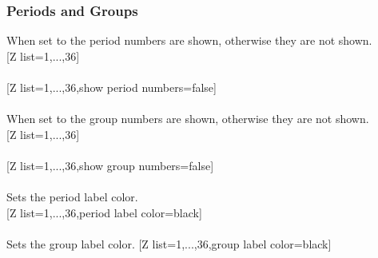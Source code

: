 \subsubsection{\texorpdfstring{ Periods and Groups}{Periods and Groups}}
\label{option_show period numbers}%
%
{When set to  the period numbers are shown, otherwise they are not shown.}%
\\ [5pt][Z list={1,...,36}]%
\\ [5pt]\makebox[\linewidth][c]{\scalebox{.6}{\pgfPT[Z list={1,...,36}]}}%
\\ [10pt][Z list={1,...,36},show period numbers=false]%
\\ [5pt]\makebox[\linewidth][c]{\scalebox{.6}{\pgfPT[Z list={1,...,36},show period numbers=false]}}%
\\ [5pt]\pgfPTendoption%
\label{option_show group numbers}%
%
{When set to  the group numbers are shown, otherwise they are not shown.}%
\\ [5pt][Z list={1,...,36}]%
\\ [10pt]\makebox[\linewidth][c]{\scalebox{.6}{\pgfPT[Z list={1,...,36}]}}%
\\ [10pt][Z list={1,...,36},show group numbers=false]%
\\ [10pt]\makebox[\linewidth][c]{\scalebox{.6}{\pgfPT[Z list={1,...,36},show group numbers=false]}}%
\\ [5pt]\pgfPTendoption%
\vfill%
\label{option_period label color}%
%
{Sets the period label color.}%
\\ [5pt][Z list={1,...,36},period label color=black]%
\\ [10pt]\makebox[\linewidth][c]{\scalebox{.6}{\pgfPT[Z list={1,...,36},period label color=black]}}%
\\ [5pt]\pgfPTendoption%
\vfill%
\label{option_group label color}%
%
{Sets the group label color.}%
\vfill%
\newpage%
[Z list={1,...,36},group label color=black]%
